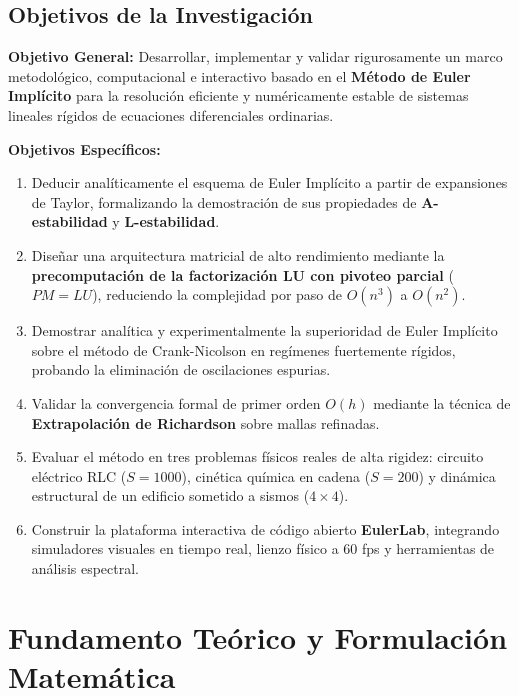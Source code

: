 \documentclass[11pt,a4paper]{article}
\begin{document}
\subsection{Objetivos de la Investigación}
\textbf{Objetivo General:} Desarrollar, implementar y validar rigurosamente un marco metodológico, computacional e interactivo basado en el \textbf{Método de Euler Implícito} para la resolución eficiente y numéricamente estable de sistemas lineales rígidos de ecuaciones diferenciales ordinarias.

\textbf{Objetivos Específicos:}
\begin{enumerate}
    \item Deducir analíticamente el esquema de Euler Implícito a partir de expansiones de Taylor, formalizando la demostración de sus propiedades de \textbf{A-estabilidad} y \textbf{L-estabilidad}.
    \item Diseñar una arquitectura matricial de alto rendimiento mediante la \textbf{precomputación de la factorización LU con pivoteo parcial} ($PM = LU$), reduciendo la complejidad por paso de $O(n^3)$ a $O(n^2)$.
    \item Demostrar analítica y experimentalmente la superioridad de Euler Implícito sobre el método de Crank-Nicolson en regímenes fuertemente rígidos, probando la eliminación de oscilaciones espurias.
    \item Validar la convergencia formal de primer orden $O(h)$ mediante la técnica de \textbf{Extrapolación de Richardson} sobre mallas refinadas.
    \item Evaluar el método en tres problemas físicos reales de alta rigidez: circuito eléctrico RLC ($S=1000$), cinética química en cadena ($S=200$) y dinámica estructural de un edificio sometido a sismos ($4 \times 4$).
    \item Construir la plataforma interactiva de código abierto \textbf{EulerLab}, integrando simuladores visuales en tiempo real, lienzo físico a 60 fps y herramientas de análisis espectral.
\end{enumerate}

\section{Fundamento Teórico y Formulación Matemática}
\end{document}
